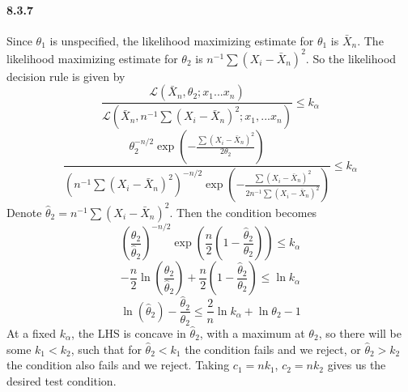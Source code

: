 \documentclass[10pt,letter]{article}
\begin{document}
\paragraph*{8.3.7}
Since $\theta_1$ is unspecified, the likelihood maximizing estimate for $\theta_1$ is $\bar{X}_n$. The likelihood maximizing estimate for $\theta_2$ is $n^{-1} \sum (X_i - \bar{X}_n)^2$. So the likelihood decision rule is given by
\[ \frac{\mathcal{L}(\bar{X}_n, \theta_2; x_1...x_n)}{\mathcal{L}(\bar{X}_n, n^{-1} \sum (X_i - \bar{X}_n)^2; x_1, ... x_n)} \le k_\alpha \]
\[ \frac{\theta_2^{-n/2}\exp\left(- \frac{\sum (X_i - \bar{X}_n)^2}{2\theta_2} \right)}{\left(n^{-1} \sum (X_i - \bar{X}_n)^2 \right)^{-n/2} \exp\left( - \frac{\sum (X_i - \bar{X}_n)^2}{2n^{-1}\sum (X_i - \bar{X}_n)^2} \right)} \le k_\alpha \]
Denote $\hat{\theta}_2 = n^{-1} \sum (X_i - \bar{X}_n)^2$. Then the condition becomes
\[ \left(\frac{\theta_2}{\hat{\theta}_2}\right)^{-n/2}\exp\left(\frac{n}{2}\left( 1 - \frac{\hat{\theta}_2}{\theta_2} \right) \right) \le k_\alpha \]
\[ - \frac{n}{2} \ln\left(\frac{\theta_2}{\hat{\theta}_2}\right) + \frac{n}{2}\left( 1 - \frac{\hat{\theta}_2}{\theta_2} \right)  \le \ln k_\alpha \]
\[  \ln\left(\hat{\theta}_2\right) - \frac{\hat{\theta}_2}{\theta_2}  \le \frac{2}{n}\ln k_\alpha +  \ln \theta_2 - 1 \]
At a fixed $k_\alpha$, the LHS is concave in $\hat{\theta}_2$, with a maximum at $\theta_2$, so there will be some $k_1 < k_2$, such that for $\hat{\theta}_2 < k_1$ the condition fails and we reject, or $\hat{\theta}_2 > k_2$ the condition also fails and we reject. Taking $c_1 = nk_1$, $c_2 = nk_2$ gives us the desired test condition.
\end{document}
